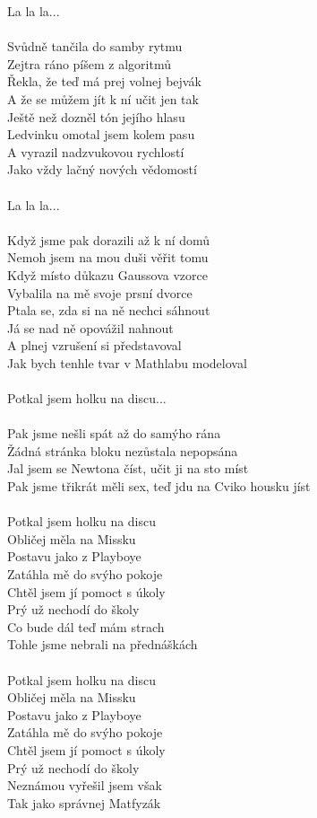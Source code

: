 \begin{multicols}{2}
La la la...\\
\\
Svůdně tančila do samby rytmu\\
Zejtra ráno píšem z algoritmů\\
Řekla, že teď má prej volnej bejvák\\
A že se můžem jít k ní učit jen tak\\
Ještě než dozněl tón jejího hlasu\\
Ledvinku omotal jsem kolem pasu\\
A vyrazil nadzvukovou rychlostí\\
Jako vždy lačný nových vědomostí\\
\\
La la la...\\
\\
Když jsme pak dorazili až k ní domů\\
Nemoh jsem na mou duši věřit tomu\\
Když místo důkazu Gaussova vzorce\\
Vybalila na mě svoje prsní dvorce\\
Ptala se, zda si na ně nechci sáhnout\\
Já se nad ně opovážil nahnout\\
A plnej vzrušení si představoval\\
Jak bych tenhle tvar v Mathlabu modeloval\\
\\
Potkal jsem holku na discu...\\
\\
Pak jsme nešli spát až do samýho rána\\
Žádná stránka bloku nezůstala nepopsána\\
Jal jsem se Newtona číst, učit ji na sto míst\\
Pak jsme třikrát měli sex, teď jdu na Cviko housku jíst\\
\\
Potkal jsem holku na discu\\
Obličej měla na Missku\\
Postavu jako z Playboye\\
Zatáhla mě do svýho pokoje\\
Chtěl jsem jí pomoct s úkoly\\
Prý už nechodí do školy\\
Co bude dál teď mám strach\\
Tohle jsme nebrali na přednáškách\\
\\
Potkal jsem holku na discu\\
Obličej měla na Missku\\
Postavu jako z Playboye\\
Zatáhla mě do svýho pokoje\\
Chtěl jsem jí pomoct s úkoly\\
Prý už nechodí do školy\\
Neznámou vyřešil jsem však\\
Tak jako správnej Matfyzák\\
\end{multicols}
